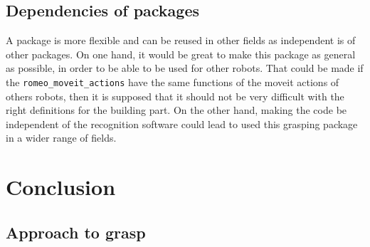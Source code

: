 \documentclass[12pt,a4paper,final,twoside,openright]{report}
\begin{document}
\section{Dependencies of packages}

A package is more flexible and can be reused in other fields as independent is of other packages. On one hand, it would be great to make this package as general as possible, in order to be able to be used for other robots. That could be made if the \texttt{romeo\_moveit\_actions} have the same functions of the moveit actions of others robots, then it is supposed that it should not be very difficult with the right definitions for the building part. On the other hand, making the code be independent of the recognition software could lead to used this grasping package in a wider range of fields.


\chapter{Conclusion}
\label{cha:conclusions}

\section{Approach to grasp}


\end{document}
